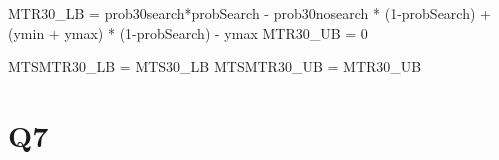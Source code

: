 \documentclass[
]{article}
\newenvironment{Shaded}{\begin{snugshade}}{\end{snugshade}}
\newcommand{\DecValTok}[1]{\textcolor[rgb]{0.00,0.00,0.81}{#1}}
\newcommand{\NormalTok}[1]{#1}
\newcommand{\OtherTok}[1]{\textcolor[rgb]{0.56,0.35,0.01}{#1}}
\newcommand{\SpecialCharTok}[1]{\textcolor[rgb]{0.00,0.00,0.00}{#1}}
\begin{document}
\begin{Shaded}
\begin{Highlighting}[]
\NormalTok{MTR30\_LB }\OtherTok{=}\NormalTok{ prob30search}\SpecialCharTok{*}\NormalTok{probSearch }\SpecialCharTok{{-}}\NormalTok{ prob30nosearch }\SpecialCharTok{*}\NormalTok{ (}\DecValTok{1}\SpecialCharTok{{-}}\NormalTok{probSearch) }\SpecialCharTok{+}\NormalTok{ (ymin }\SpecialCharTok{+}\NormalTok{ ymax) }\SpecialCharTok{*}\NormalTok{ (}\DecValTok{1}\SpecialCharTok{{-}}\NormalTok{probSearch) }\SpecialCharTok{{-}}\NormalTok{ ymax}
\NormalTok{MTR30\_UB }\OtherTok{=} \DecValTok{0}

\NormalTok{MTSMTR30\_LB }\OtherTok{=}\NormalTok{ MTS30\_LB}
\NormalTok{MTSMTR30\_UB }\OtherTok{=}\NormalTok{ MTR30\_UB}
\end{Highlighting}
\end{Shaded}

\hypertarget{q7}{%
\section{Q7}\label{q7}}
\end{document}
